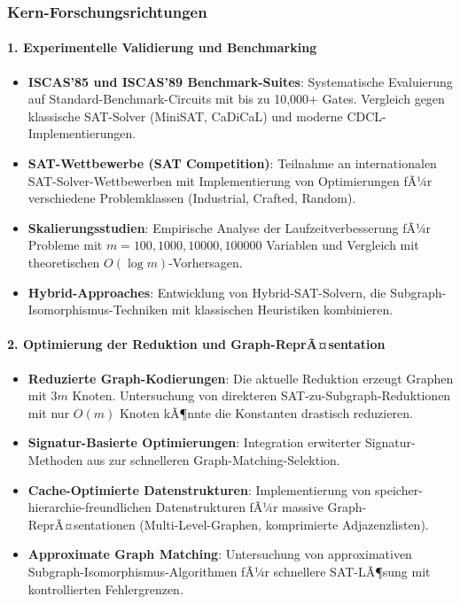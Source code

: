 ﻿\documentclass[a4paper,12pt]{article}
\theoremstyle{definition}
\begin{document}
\subsubsection{Kern-Forschungsrichtungen}

\paragraph{1. Experimentelle Validierung und Benchmarking}

\begin{itemize}
	\item \textbf{ISCAS'85 und ISCAS'89 Benchmark-Suites}: Systematische Evaluierung auf Standard-Benchmark-Circuits mit bis zu 10,000+ Gates. Vergleich gegen klassische SAT-Solver (MiniSAT, CaDiCaL) und moderne CDCL-Implementierungen.
	
	\item \textbf{SAT-Wettbewerbe (SAT Competition)}: Teilnahme an internationalen SAT-Solver-Wettbewerben mit Implementierung von Optimierungen fÃ¼r verschiedene Problemklassen (Industrial, Crafted, Random).
	
	\item \textbf{Skalierungsstudien}: Empirische Analyse der Laufzeitverbesserung fÃ¼r Probleme mit $m = 100, 1000, 10000, 100000$ Variablen und Vergleich mit theoretischen $O(\log m)$-Vorhersagen.
	
	\item \textbf{Hybrid-Approaches}: Entwicklung von Hybrid-SAT-Solvern, die Subgraph-Isomor\-phismus-Techniken mit klassischen Heuristiken kombinieren.
\end{itemize}

\paragraph{2. Optimierung der Reduktion und Graph-ReprÃ¤sentation}

\begin{itemize}
	\item \textbf{Reduzierte Graph-Kodierungen}: Die aktuelle Reduktion erzeugt Graphen mit $3m$ Knoten. Untersuchung von direkteren SAT-zu-Subgraph-Reduktionen mit nur $O(m)$ Knoten kÃ¶nnte die Konstanten drastisch reduzieren.
	
	\item \textbf{Signatur-Basierte Optimierungen}: Integration erwiterter Signatur-Methoden aus \cite{Epp26} zur schnelleren Graph-Matching-Selektion.
	
	\item \textbf{Cache-Optimierte Datenstrukturen}: Implementierung von speicher-hierarchie-freundlichen Datenstrukturen fÃ¼r massive Graph-ReprÃ¤sentationen (Multi-Level-Graphen, komprimierte Adjazenzlisten).
	
	\item \textbf{Approximate Graph Matching}: Untersuchung von approximativen Subgraph-Isomorphismus-Algorithmen fÃ¼r schnellere SAT-LÃ¶sung mit kontrollierten Fehlergrenzen.
\end{itemize}
\end{document}
